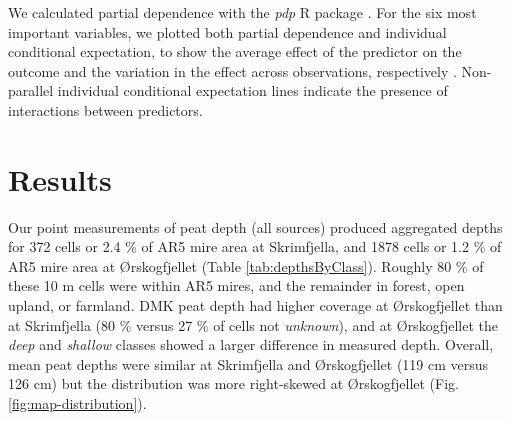 \documentclass[soil, manuscript]{copernicus}
\begin{document}
We calculated partial dependence with the \emph{pdp} R package \citep[v0.8,][]{greenwellPdpPackageConstructing2017}.
For the six most important variables, we plotted both partial dependence and individual conditional expectation, to show the average effect of the predictor on the outcome and the variation in the effect across observations, respectively \citep{goldsteinPeekingBlackBox2015}.
Non-parallel individual conditional expectation lines indicate the presence of interactions between predictors.

\section{Results}

Our point measurements of peat depth (all sources) produced aggregated depths for 372 cells or 2.4 \% of AR5 mire area at Skrimfjella, and 1878 cells or 1.2 \% of AR5 mire area at Ørskogfjellet (Table \ref{tab:depthsByClass}).
Roughly 80 \% of these 10 m cells were within AR5 mires, and the remainder in forest, open upland, or farmland.
DMK peat depth had higher coverage at Ørskogfjellet than at Skrimfjella (80 \% versus 27 \% of cells not \emph{unknown}), and at Ørskogfjellet the \emph{deep} and \emph{shallow} classes showed a larger difference in measured depth.
Overall, mean peat depths were similar at Skrimfjella and Ørskogfjellet (119 cm versus 126 cm) but the distribution was more right-skewed at Ørskogfjellet (Fig. \ref{fig:map-distribution}).
\end{document}

